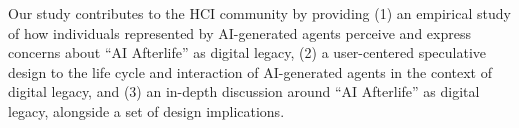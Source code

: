 Our study contributes to the HCI community by providing
(1) an empirical study of how individuals represented by AI-generated agents perceive and express concerns about ``AI Afterlife'' as digital legacy, 
(2) a user-centered speculative design to the life cycle and interaction of AI-generated agents in the context of digital legacy, and
(3) an in-depth discussion around ``AI Afterlife'' as digital legacy, alongside a set of design implications.